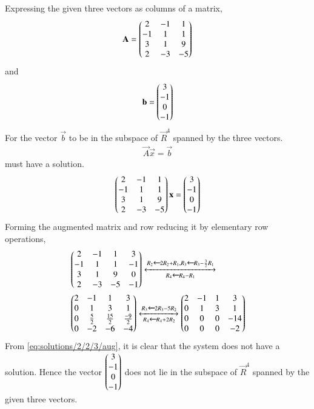 Expressing the given three vectors as columns of a matrix, 
\begin{align}
    \mathbf{A} = \begin{pmatrix}2&-1&1\\-1&1&1\\3&1&9\\2&-3&-5\end{pmatrix} 
\end{align}
and
\begin{align}
    \mathbf{b} = \begin{pmatrix}3\\-1\\0\\-1\end{pmatrix}
\end{align}
For the vector $\vec{b}$ to be in the subspace of $\vec{R}^{4}$ spanned  by the three vectors. 
\begin{align}
    \vec{A}\vec{x} = \vec{b}
\end{align}
must have a solution. 
\begin{align}
    \begin{pmatrix}2&-1&1\\-1&1&1\\3&1&9\\2&-3&-5\end{pmatrix}\mathbf{x} =  \begin{pmatrix}3\\-1\\0\\-1\end{pmatrix}
\end{align}
Forming the augmented matrix and row reducing it by elementary row operations,
\begin{align}
    &\begin{pmatrix}2&-1&1&3\\-1&1&1&-1\\3&1&9&0\\2&-3&-5&-1\end{pmatrix} \xleftrightarrow[R_4\xleftarrow{}R_4-R_1 ]{R_2\xleftarrow{}2R_2+R_1,R_3\xleftarrow{} R_3-\frac{3}{2}R_1} \\
    &\begin{pmatrix}2&-1&1&3\\0&1&3&1\\0&\frac{5}{2}&\frac{15}{2}&\frac{-9}{2}\\0&-2&-6&-4\end{pmatrix}
    \xleftrightarrow[R_4\xleftarrow{}R_4+2R_2]{R_3\xleftarrow{}2R_3-5R_2}
    \begin{pmatrix}2&-1&1&3\\0&1&3&1\\0&0&0&-14\\0&0&0&-2\end{pmatrix} \label{eq:solutions/2/2/3/aug}
\end{align}
From \eqref{eq:solutions/2/2/3/aug}, it is clear that the system does not have a solution. 
Hence the vector $\begin{pmatrix}3\\-1\\0\\-1\end{pmatrix}$ does not lie in the subspace of $\vec{R}^{4}$ spanned by the given three vectors. 

